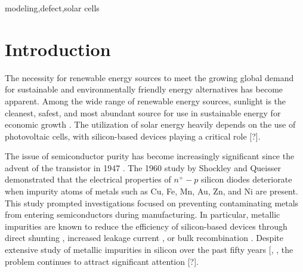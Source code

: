 \documentclass[a4paper,fleqn]{cas-sc}
\begin{document}
\begin{keywords}
 modeling\sep defect\sep solar cells
\end{keywords}

\maketitle

\section{Introduction}%
\par
The necessity for renewable energy sources to meet the growing global demand for sustainable and environmentally friendly energy alternatives has become apparent. Among the wide range of renewable energy sources, sunlight is the cleanest, safest, and most abundant source for use in sustainable energy for economic growth \cite{PratapSingh2019}. The utilization of solar energy heavily depends on the use of photovoltaic cells, with silicon-based devices playing a critical role [?].


The issue of semiconductor purity has become increasingly significant since the advent of the transistor in 1947 \cite{Claers2018}. The 1960 study by Shockley and Queisser \cite{Goetzberger1960} demonstrated that the electrical properties of $n^{+}-p$ silicon diodes deteriorate when impurity atoms of metals such as Cu, Fe, Mn, Au, Zn, and Ni are present. This study prompted investigations focused on preventing contaminating metals from entering semiconductors during manufacturing. In particular, metallic impurities are known to reduce the efficiency of silicon-based devices through direct shunting \cite{Rsh:Breitenstein}, increased leakage current \cite{Lee1980}, or bulk recombination \cite{Istratov2000}. Despite extensive study of metallic impurities in silicon over the past fifty years [\cite{Claers2018}, \cite{Pearce1977}, the problem continues to attract significant attention [?].
\end{document}
